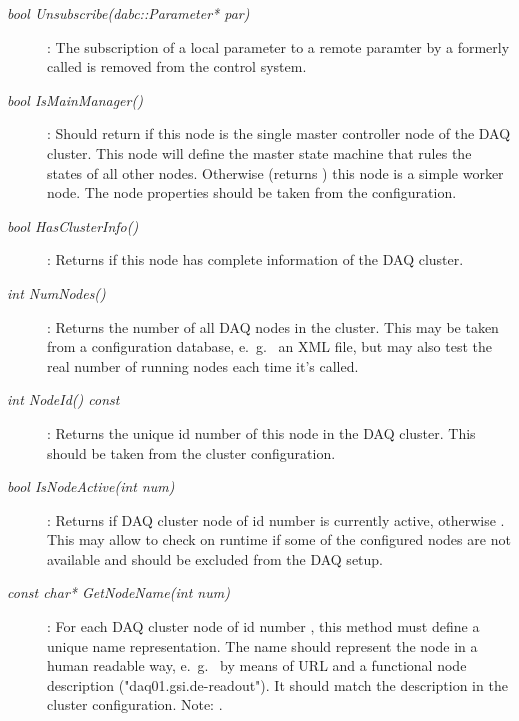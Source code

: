 \begin{description}
\item[\em bool Unsubscribe(dabc::Parameter* par)] :
The subscription of a local parameter  to a remote paramter by
a formerly called  is removed from the control system.


\item[\em bool IsMainManager()] :
Should return  if this node is the single 
master controller node of the DAQ cluster. This node will define
the master state machine that rules the states 
of all other nodes.
Otherwise (returns ) this node is a simple worker node.
The node properties should be taken from the configuration.

\item[\em bool HasClusterInfo()]:
Returns  if this node has complete information of the DAQ cluster.


\item[\em int NumNodes()] :
Returns the number of all DAQ nodes in the cluster. This may be taken
from a configuration database, e.~g.~ an XML file, but may also test the
real number of running nodes each time it's called.

\item[\em int NodeId() const] : 
Returns the unique id number of this node in the DAQ cluster.
This should be taken from the cluster configuration.

\item[\em bool IsNodeActive(int num)] : 
Returns  if DAQ cluster node of id number 
is currently active, otherwise . 
This may allow to check on runtime if some of the
configured nodes are not available and should be excluded from the
DAQ setup.

\item[\em const char* GetNodeName(int num)] :
For each DAQ cluster node of id number ,
this method must define a unique name representation. 
The name should represent the node in a human readable
way, e.~g.~ by means of URL and a functional node description
("daq01.gsi.de-readout"). It should match the
description in the cluster configuration.
Note: .




\end{description}
